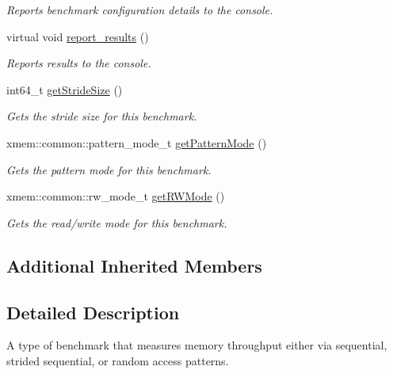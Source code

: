 \begin{DoxyCompactItemize}
\begin{DoxyCompactList}\small\item\em Reports benchmark configuration details to the console. \end{DoxyCompactList}\item 
\hypertarget{classxmem_1_1benchmark_1_1_throughput_benchmark_a7df909bd544d1399e756a98bfbce2561}{}virtual void \hyperlink{classxmem_1_1benchmark_1_1_throughput_benchmark_a7df909bd544d1399e756a98bfbce2561}{report\+\_\+results} ()\label{classxmem_1_1benchmark_1_1_throughput_benchmark_a7df909bd544d1399e756a98bfbce2561}

\begin{DoxyCompactList}\small\item\em Reports results to the console. \end{DoxyCompactList}\item 
int64\+\_\+t \hyperlink{classxmem_1_1benchmark_1_1_throughput_benchmark_ad31b0fecafb174be0509581cda099d55}{get\+Stride\+Size} ()
\begin{DoxyCompactList}\small\item\em Gets the stride size for this benchmark. \end{DoxyCompactList}\item 
xmem\+::common\+::pattern\+\_\+mode\+\_\+t \hyperlink{classxmem_1_1benchmark_1_1_throughput_benchmark_a2c7dc699b2ae013edd9de871778dff7b}{get\+Pattern\+Mode} ()
\begin{DoxyCompactList}\small\item\em Gets the pattern mode for this benchmark. \end{DoxyCompactList}\item 
xmem\+::common\+::rw\+\_\+mode\+\_\+t \hyperlink{classxmem_1_1benchmark_1_1_throughput_benchmark_acd839b1c7a1d51ff3ce7921a36d65e98}{get\+R\+W\+Mode} ()
\begin{DoxyCompactList}\small\item\em Gets the read/write mode for this benchmark. \end{DoxyCompactList}\end{DoxyCompactItemize}
\subsection*{Additional Inherited Members}


\subsection{Detailed Description}
A type of benchmark that measures memory throughput either via sequential, strided sequential, or random access patterns. 

